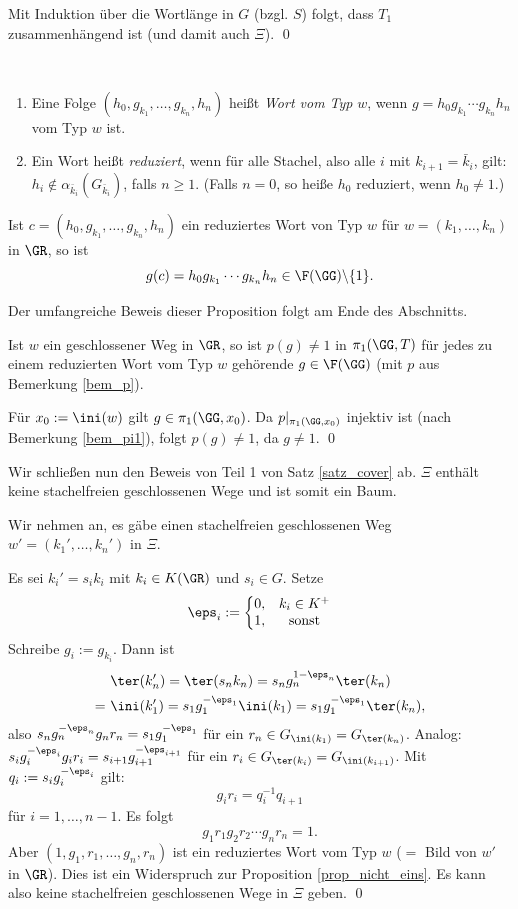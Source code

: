 Mit Induktion über die Wortlänge in $G$ (bzgl. $S$) folgt,
dass $T_1$ zusammenhängend ist (und damit auch $\Xi$).
\qed

\DEF\
\begin{enumerate}
\item Eine Folge $(h_0,g_{k_1},\ldots,g_{k_n},h_n)$ heißt
\emph{Wort vom Typ} $w$, wenn $g=h_0 g_{k_1}\cdots g_{k_n} h_n$
vom Typ $w$ ist.
\item Ein Wort heißt \emph{reduziert},
wenn für alle Stachel, also alle $i$ mit $k_{i+1}=\bar{k}_i$, gilt:
$h_i\not\in \alpha_{\bar{k}_i}(G_{\bar{k}_i})$, falls $n\geq 1$.
(Falls $n=0$, so heiße $h_0$ reduziert, wenn $h_0\neq 1$.)
\end{enumerate}

\PROP\label{prop_nicht_eins}
Ist $c=(h_0,g_{k_1},\ldots,g_{k_n},h_n)$ ein reduziertes Wort
von Typ $w$ für $w=(k_1,\ldots,k_n)$ in $\GR$, so ist
\[
g(c) = h_0 g_{k_1}\cdots g_{k_n} h_n \in \F(\GG)\backslash\{ 1 \}.
\]

Der umfangreiche Beweis dieser Proposition folgt am Ende
des Abschnitts.

\FOLG Ist $w$ ein geschlossener Weg in $\GR$, so ist $p(g)\neq 1$
in $\pi_1(\GG,T)$ für jedes zu einem reduzierten Wort vom Typ $w$
gehörende $g\in \F(\GG)$ (mit $p$ aus Bemerkung \ref{bem_p}).

\bew Für $x_0 := \ini(w)$ gilt $g\in \pi_1(\GG,x_0)$.
Da $p|_{\pi_1(\GG,x_0)}$ injektiv ist (nach Bemerkung \ref{bem_pi1}),
folgt $p(g)\neq 1$, da $g\neq 1$.
\qed

Wir schließen nun den Beweis von Teil 1 von Satz \ref{satz_cover} ab.
\BEM $\Xi$ enthält keine stachelfreien geschlossenen
Wege und ist somit ein Baum.

\bew Wir nehmen an, es gäbe einen stachelfreien geschlossenen Weg
$w'=(k_1',\ldots,k_n')$ in $\Xi$.

Es sei $k_i' = s_i k_i$ mit $k_i \in K(\GR)$ und $s_i\in G$.
Setze
\[
\eps_i := \left\{
\begin{matrix}
0, & k_i \in K^+ \\
1, & \text{sonst}
\end{matrix}\right.
\]
Schreibe $g_i := g_{k_i}$. Dann ist
\begin{align*}
& \ter(k_n') = \ter(s_n k_n) = s_n g_n^{1-\eps_n} \ter(k_n) \\
=\ & \ini(k_1')=s_1 g_1^{-\eps_1}\ini(k_1)=s_1 g_1^{-\eps_1}\ter(k_n),
\end{align*}
also $s_n g_n^{-\eps_n} g_n r_n = s_1 g_1^{-\eps_1}$ für ein
$r_n \in G_{\ini(k_1)}=G_{\ter(k_n)}$.
Analog: $s_i g_i^{-\eps_i} g_i r_i = s_{i+1} g_{i+1}^{-\eps_{i+1}}$
für ein $r_i\in G_{\ter(k_i)}=G_{\ini(k_{i+1})}$.
Mit $q_i := s_i g_i^{-\eps_i}$ gilt:
\[
g_i r_i = q_i^{-1} q_{i+1}
\]
für $i=1,\ldots, n-1$.
Es folgt
\[
g_1 r_1 g_2 r_2 \cdots g_n r_n = 1.
\]
Aber $(1,g_1,r_1,\ldots,g_n,r_n)$ ist ein reduziertes Wort vom Typ
$w$ ($=$ Bild von $w'$ in $\GR$).
Dies ist ein Widerspruch zur Proposition \ref{prop_nicht_eins}.
Es kann also keine stachelfreien geschlossenen Wege in $\Xi$ geben.
\qed

